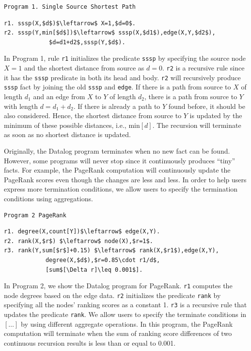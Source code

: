 \begin{verbatim}
Program 1. Single Source Shortest Path
\end{verbatim}
\vspace{-0.1in}
\small
\begin{lstlisting}
r1. sssp(X,$d$)$\leftarrow$ X=1,$d=0$.
r2. sssp(Y,min[$d$])$\leftarrow$ sssp(X,$d1$),edge(X,Y,$d2$),
		     $d=d1+d2$,sssp(Y,$d$).
\end{lstlisting}
\normalsize

In Program 1, rule \texttt{r1} initializes the predicate \texttt{sssp} by specifying the source node $X=1$ and the shortest distance from source as $d=0$. \texttt{r2} is a recursive rule since it has the \texttt{sssp} predicate in both its head and body. \texttt{r2} will recursively produce \texttt{sssp} fact by joining the old \texttt{sssp} and \texttt{edge}. If there is a path from source to $X$ of length $d_1$ and an edge from $X$ to $Y$ of length $d_2$, there is a path from source to $Y$ with length $d=d_1+d_2$. If there is already a path to $Y$ found before, it should be also considered. Hence, the shortest distance from source to $Y$ is updated by the minimum of these possible distances, i.e., min$[d]$. The recursion will terminate as soon as no shortest distance is updated.

Originally, the Datalog program terminates when no new fact can be found. However, some programs will never stop since it continuously produces ``tiny'' facts. For example, the PageRank computation will continuously update the PageRank scores even though the changes are less and less. In order to help users express more termination conditions, we allow users to specify the termination conditions using aggregations.


\begin{verbatim}
Program 2 PageRank
\end{verbatim}
\vspace{-0.1in}
\small
\begin{lstlisting}
r1. degree(X,count[Y])$\leftarrow$ edge(X,Y).
r2. rank(X,$r$) $\leftarrow$ node(X),$r=1$.
r3. rank(Y,sum[$r$]+0.15) $\leftarrow$ rank(X,$r1$),edge(X,Y),
			degree(X,$d$),$r=0.85\cdot r1/d$,
			[sum$[\Delta r]\leq 0.001$].
\end{lstlisting}
\normalsize

In Program 2, we show the Datalog program for PageRank. \texttt{r1} computes the node degrees based on the edge data. \texttt{r2} initializes the predicate \texttt{rank} by specifying all the nodes' ranking scores as a constant 1. \texttt{r3} is a recursive rule that updates the predicate \texttt{rank}. We allow users to specify the terminate conditions in $[\ldots]$ by using different aggregate operations. In this program, the PageRank computation will terminate when the sum of ranking score differences of two continuous recursion results is less than or equal to 0.001.

